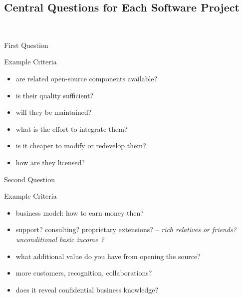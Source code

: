 \subsection{Central Questions for Each Software Project}
\begin{frame}{\insertsubsection\ \mytitlesource{\sommerville}} %
	\begin{fancycolumns}
		\begin{note}{First Question}
		\end{note}
		\begin{example}{Example Criteria}
			\begin{itemize}
				\item are related open-source components available?
				\item is their quality sufficient?
				\item will they be maintained?
				\item what is the effort to integrate them?
				\item is it cheaper to modify or redevelop them?
				\item how are they licensed?
			\end{itemize}
		\end{example}
		\nextcolumn
		\begin{note}{Second Question}
		\end{note}
		\begin{example}{Example Criteria}
			\begin{itemize}
				\item business model: how to earn money then? %
				\item support? consulting? proprietary extensions? -- \textit{rich relatives or friends? unconditional basic income ?}
				\item what additional value do you have from opening the source?
				\item more customers, recognition, collaborations?
				\item does it reveal confidential business knowledge?
			\end{itemize}
		\end{example}
	\end{fancycolumns}
\end{frame}

